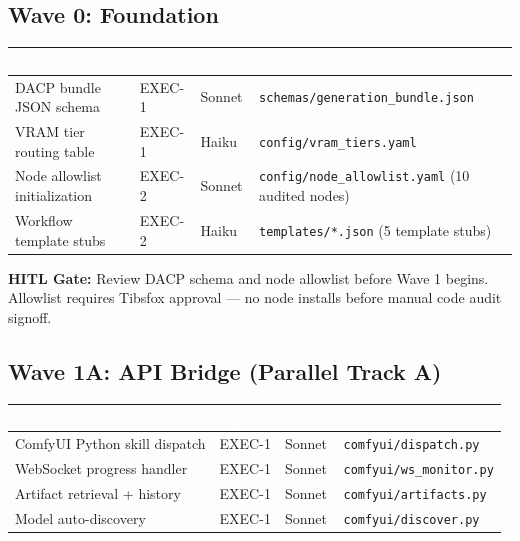 \documentclass[11pt,letterpaper]{article}
\newcommand{\tableheader}[1]{\textbf{\sffamily\textcolor{white}{#1}}}
\begin{document}
\subsection{Wave 0: Foundation}

\begin{center}
\begin{tabularx}{\textwidth}{L{4cm}L{2cm}L{1.8cm}X}
\toprule
{}
\tableheader{Task} & \tableheader{Agent} & \tableheader{Model} & \tableheader{Deliverable} \\
\midrule
DACP bundle JSON schema & EXEC-1 & Sonnet & \texttt{schemas/generation\_bundle.json} \\
VRAM tier routing table & EXEC-1 & Haiku & \texttt{config/vram\_tiers.yaml} \\
Node allowlist initialization & EXEC-2 & Sonnet & \texttt{config/node\_allowlist.yaml} (10 audited nodes) \\
Workflow template stubs & EXEC-2 & Haiku & \texttt{templates/*.json} (5 template stubs) \\
\bottomrule
\end{tabularx}
\end{center}

\textbf{HITL Gate:} Review DACP schema and node allowlist before Wave 1 begins. Allowlist
requires Tibsfox approval --- no node installs before manual code audit signoff.

\subsection{Wave 1A: API Bridge (Parallel Track A)}

\begin{center}
\begin{tabularx}{\textwidth}{L{4cm}L{2cm}L{1.8cm}X}
\toprule
{}
\tableheader{Task} & \tableheader{Agent} & \tableheader{Model} & \tableheader{Deliverable} \\
\midrule
ComfyUI Python skill dispatch & EXEC-1 & Sonnet & \texttt{comfyui/dispatch.py} \\
WebSocket progress handler & EXEC-1 & Sonnet & \texttt{comfyui/ws\_monitor.py} \\
Artifact retrieval + history & EXEC-1 & Sonnet & \texttt{comfyui/artifacts.py} \\
Model auto-discovery & EXEC-1 & Sonnet & \texttt{comfyui/discover.py} \\
\bottomrule
\end{tabularx}
\end{center}
\end{document}
